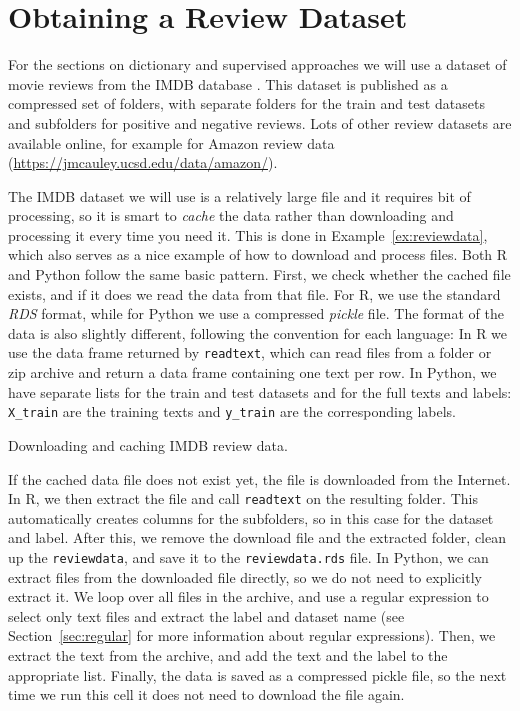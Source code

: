 %

\section{Obtaining a Review Dataset}
\label{sec:reviewdataset}

For the sections on dictionary and supervised approaches we will use a dataset of movie reviews
from the IMDB database \citep{aclimdb}.
This dataset is published as a compressed set of folders, with separate folders for the train and test datasets and subfolders for positive and negative reviews.
Lots of other review datasets are available online, for example for Amazon review data (\url{https://jmcauley.ucsd.edu/data/amazon/}).

The IMDB dataset we will use is a relatively large file and it requires bit of processing,
so it is smart to \emph{cache} the data rather than downloading and processing it every time you need it.
This is done in Example~\ref{ex:reviewdata}, which also serves as a nice example of how to download and process files.
Both R and Python follow the same basic pattern.
First, we check whether the cached file exists, and if it does we read the data from that file.
For R, we use the standard \emph{RDS} format, while for Python we use a compressed \emph{pickle} file.
The format of the data is also slightly different, following the convention for each language:
In R we use the data frame returned by \texttt{readtext},
which can read files from a folder or zip archive and return a data frame containing one text per row.
In Python, we have separate lists for the train and test datasets and for the full texts and labels:
\verb|X_train| are the training texts and \verb|y_train| are the corresponding labels.

\begin{ccsexample}
  \caption{Downloading and caching IMDB review data.}\label{ex:reviewdata}
\end{ccsexample}

If the cached data file does not exist yet,
the file is downloaded from the Internet.
In R, we then extract the file and call \texttt{readtext} on the resulting folder.
This automatically creates columns for the subfolders, so in this case for the dataset and label.
After this, we remove the download file and the extracted folder,
clean up the \verb|reviewdata|, and save it to the \verb|reviewdata.rds| file.
In Python, we can extract files from the downloaded file directly,
so we do not need to explicitly extract it.
We loop over all files in the archive, and use a regular expression to
select only text files and extract the label and dataset name
(see Section~\ref{sec:regular} for more information about regular expressions).
Then, we extract the text from the archive, and add the text and the label to the appropriate list.
Finally, the data is saved as a compressed pickle file,
so the next time we run this cell it does not need to download the file again.



